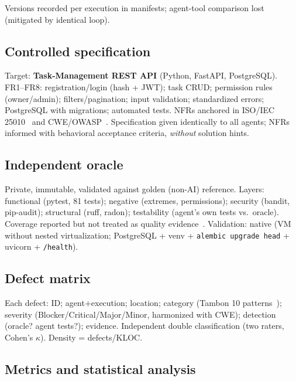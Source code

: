\documentclass[10pt,twocolumn]{article}
\begin{document}
Versions recorded per execution in manifests; agent-tool comparison lost (mitigated by identical loop).

\subsection{Controlled specification}

Target: \textbf{Task-Management REST API} (Python, FastAPI, PostgreSQL). FR1--FR8: registration/login (hash + JWT); task CRUD; permission rules (owner/admin); filters/pagination; input validation; standardized errors; PostgreSQL with migrations; automated tests. NFRs anchored in ISO/IEC 25010~\cite{D04} and CWE/OWASP~\cite{E01,E02,E03}. Specification given identically to all agents; NFRs informed with behavioral acceptance criteria, \emph{without} solution hints.

\subsection{Independent oracle}

Private, immutable, validated against golden (non-AI) reference. Layers: functional (pytest, 81 tests); negative (extremes, permissions); security (bandit, pip-audit); structural (ruff, radon); testability (agent's own tests vs.\ oracle). Coverage reported but not treated as quality evidence~\cite{C05}. Validation: native (VM without nested virtualization; PostgreSQL + venv + \texttt{alembic upgrade head} + uvicorn + \texttt{/health}).

\subsection{Defect matrix}

Each defect: ID; agent+execution; location; category (Tambon 10 patterns~\cite{B01}); severity (Blocker/Critical/Major/Minor, harmonized with CWE); detection (oracle? agent tests?); evidence. Independent double classification (two raters, Cohen's $\kappa$). Density = defects/KLOC.

\subsection{Metrics and statistical analysis}
\end{document}
